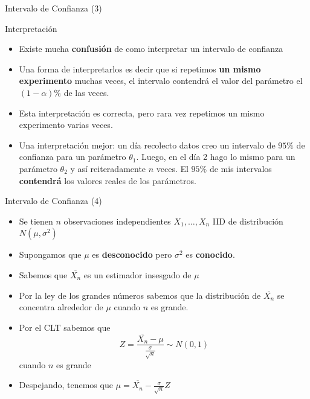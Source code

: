 \documentclass[handout]{beamer}
\begin{document}
\begin{frame}{Intervalo de Confianza (3)}
\scriptsize{

\begin{block}{Interpretación}
\begin{itemize}
 \item Existe mucha \textbf{confusión} de como interpretar un intervalo de confianza
 \item Una forma de interpretarlos es decir que si repetimos \textbf{un mismo experimento} muchas veces, el intervalo contendrá el valor del parámetro el $(1-\alpha)\%$ de las veces.
 \item Esta interpretación es correcta, pero rara vez repetimos un mismo experimento varias veces.
 \item Una interpretación mejor: un día recolecto datos creo un intervalo de $95\%$ de confianza para un parámetro $\theta_1$. Luego, en el día 2 hago lo mismo para un parámetro $\theta_2$ y así reiteradamente $n$ veces. El $95\%$ de mis intervalos \textbf{contendrá} los valores reales de los parámetros.
 
\end{itemize}

\end{block}

}
 
\end{frame}

\begin{frame}{Intervalo de Confianza (4)}
\scriptsize{
\begin{itemize}
 \item Se tienen $n$ observaciones independientes $X_1, \dots, X_n$ IID de distribución  $N(\mu,\sigma^2)$
 \item Supongamos que $\mu$ es \textbf{desconocido} pero $\sigma^2$ es \textbf{conocido}.
 \item Sabemos que $\overline{X_{n}}$ es un estimador insesgado de $\mu$
 \item Por la ley de los grandes números sabemos que la distribución de $\overline{X_{n}}$ se concentra alrededor de $\mu$ cuando $n$ es grande.
 \item Por el CLT sabemos que \begin{displaymath}
 Z=\frac{\overline{X_{n}}-\mu}{\frac{\sigma}{\sqrt{n}}}  \sim N(0,1)
\end{displaymath}
cuando $n$ es grande
\item Despejando, tenemos que $\mu = \overline{X_{n}} - \frac{\sigma}{\sqrt{n}}Z$
\end{itemize}


 }
\end{frame}
\end{document}
